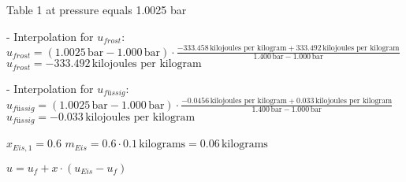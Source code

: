 Table 1 at pressure equals 1.0025 bar  

- Interpolation for \( u_{frost} \):  
\( u_{frost} = (1.0025 \, \text{bar} - 1.000 \, \text{bar}) \cdot \frac{-333.458 \, \text{kilojoules per kilogram} + 333.492 \, \text{kilojoules per kilogram}}{1.400 \, \text{bar} - 1.000 \, \text{bar}} \)  
\( u_{frost} = -333.492 \, \text{kilojoules per kilogram} \)  

- Interpolation for \( u_{füssig} \):  
\( u_{füssig} = (1.0025 \, \text{bar} - 1.000 \, \text{bar}) \cdot \frac{-0.0456 \, \text{kilojoules per kilogram} + 0.033 \, \text{kilojoules per kilogram}}{1.400 \, \text{bar} - 1.000 \, \text{bar}} \)  
\( u_{füssig} = -0.033 \, \text{kilojoules per kilogram} \)  

\( x_{Eis,1} = 0.6 \)  
\( m_{Eis} = 0.6 \cdot 0.1 \, \text{kilograms} = 0.06 \, \text{kilograms} \)  

\( u = u_{f} + x \cdot (u_{Eis} - u_{f}) \)